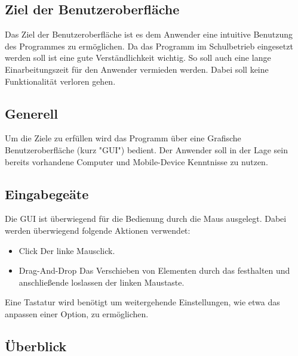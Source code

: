 \documentclass[parskip=full]{scrartcl}
\begin{document}
\subsection{Ziel der Benutzeroberfläche}

Das Ziel der Benutzeroberfläche ist es dem Anwender eine intuitive Benutzung des Programmes zu ermöglichen. Da das Programm im Schulbetrieb eingesetzt werden soll ist eine gute Verständlichkeit wichtig. So soll auch eine lange Einarbeitungszeit für den Anwender vermieden werden. Dabei soll keine Funktionalität verloren gehen.

\subsection{Generell}

Um die Ziele zu erfüllen wird das Programm über eine Grafische Benutzeroberfläche (kurz "GUI") bedient. Der Anwender soll in der Lage sein bereits vorhandene Computer und Mobile-Device Kenntnisse zu nutzen.

\subsection{Eingabegeäte}

Die GUI ist überwiegend für die Bedienung durch die Maus ausgelegt. Dabei werden überwiegend folgende Aktionen verwendet:

\begin{itemize} 
	\item Click \newline Der linke Mausclick.
	\item Drag-And-Drop \newline Das Verschieben von Elementen durch das festhalten und anschließende loslassen der linken Maustaste.
\end{itemize}

Eine Tastatur wird benötigt um weitergehende Einstellungen, wie etwa das anpassen einer Option, zu ermöglichen.



\subsection{Überblick}
\end{document}
